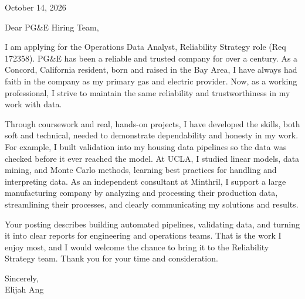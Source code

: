 \documentclass[11pt,letterpaper]{article}
\begin{document}


\vspace{12pt}

October 14, 2026

Dear PG\&E Hiring Team,

I am applying for the Operations Data Analyst, Reliability Strategy role (Req 172358). PG\&E has been a reliable and trusted company for over a century. As a Concord, California resident, born and raised in the Bay Area, I have always had faith in the company as my primary gas and electric provider. Now, as a working professional, I strive to maintain the same reliability and trustworthiness in my work with data.

Through coursework and real, hands-on projects, I have developed the skills, both soft and technical, needed to demonstrate dependability and honesty in my work. For example, I built validation into my housing data pipelines so the data was checked before it ever reached the model. At UCLA, I studied linear models, data mining, and Monte Carlo methods, learning best practices for handling and interpreting data. As an independent consultant at Minthril, I support a large manufacturing company by analyzing and processing their production data, streamlining their processes, and clearly communicating my solutions and results.

Your posting describes building automated pipelines, validating data, and turning it into clear reports for engineering and operations teams. That is the work I enjoy most, and I would welcome the chance to bring it to the Reliability Strategy team. Thank you for your time and consideration.

Sincerely,\\
Elijah Ang
\end{document}
